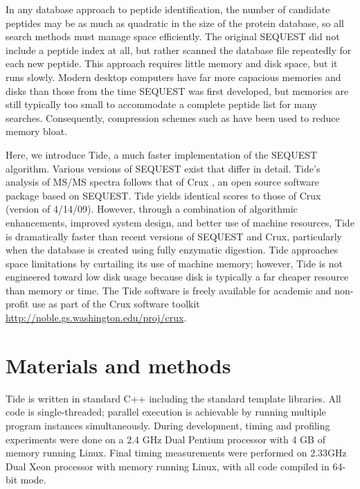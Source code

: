 In any database approach to peptide identification, the number of
candidate peptides may be as much as quadratic in the size of the
protein database, so all search methods must manage space
efficiently. The original SEQUEST did not include a peptide index at
all, but rather scanned the database file repeatedly for each new
peptide. This approach requires little memory and disk space, but it
runs slowly. Modern desktop computers have far more capacious memories
and disks than those from the time SEQUEST was first developed, but
memories are still typically too small to accommodate a complete
peptide list for many searches. Consequently, compression schemes such
as \cite{edwards:sequence} \DIFaddbegin {}\cite{edwards:novel} \DIFaddend have been used to
reduce memory bloat.

Here, we introduce Tide, a much faster implementation of the SEQUEST
algorithm. Various versions of SEQUEST exist that differ in
detail. Tide's analysis of MS/MS spectra follows that of Crux
\cite{park:rapid}, an open source software package based on SEQUEST.
Tide yields identical \XCorr scores to those of Crux (version of
4/14/09).  However, through a combination of algorithmic enhancements,
improved system design, and better use of machine resources, Tide is
dramatically faster than recent versions of SEQUEST and Crux,
particularly when the database is created using fully enzymatic
digestion. Tide approaches space limitations by curtailing its use of
machine memory; however, Tide is not engineered toward low disk usage
because disk is typically a far cheaper resource than memory or time.
The Tide software is freely available for academic and non-profit use
as part of the Crux software toolkit
\url{http://noble.gs.washington.edu/proj/crux}.

\section{Materials and methods \label{section:methods}}

Tide is written in standard C++ including the standard template
libraries. All code is single-threaded; parallel execution is
achievable by running multiple program instances simultaneously.
During development, timing and profiling experiments were done on a
2.4 GHz Dual Pentium processor with 4 GB of memory running
Linux. Final timing measurements were performed on 2.33GHz Dual Xeon
processor with \DIFdelbegin {}\DIFdelend \DIFaddbegin {}\DIFaddend memory running Linux, with all code compiled in
64-bit mode.

